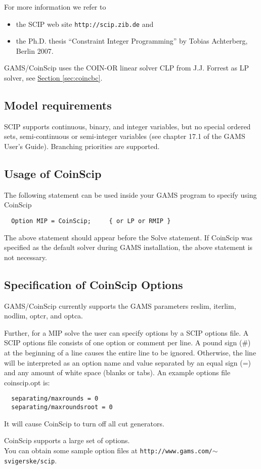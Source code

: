 For more information we refer to
\begin{itemize}
\item the SCIP web site \texttt{http://scip.zib.de} and
\item the Ph.D. thesis ``Constraint Integer Programming'' by Tobias Achterberg, Berlin 2007.
\end{itemize}

GAMS/CoinScip uses the COIN-OR linear solver CLP from J.J. Forrest as LP solver, see \hyperlink{sec:coincbc}{Section \ref{sec:coincbc}}.

\subsection{Model requirements}

SCIP supports continuous, binary, and integer variables, but no special ordered sets, semi-continuous or semi-integer variables (see chapter 17.1 of the GAMS User's Guide).
Branching priorities are supported.

\subsection{Usage of CoinScip}

The following statement can be used inside your GAMS program to specify using CoinScip
\begin{verbatim}
  Option MIP = CoinScip;     { or LP or RMIP }
\end{verbatim}

The above statement should appear before the Solve statement.
If CoinScip was specified as the default solver during GAMS installation, the above statement is not necessary.

\subsection{Specification of CoinScip Options}

GAMS/CoinScip currently supports the GAMS parameters reslim, iterlim, nodlim, optcr, and optca.

Further, for a MIP solve the user can specify options by a SCIP options file.
A SCIP options file consists of one option or comment per line.
A pound sign (\#) at the beginning of a line causes the entire line to be ignored.
Otherwise, the line will be interpreted as an option name and value separated by an equal sign (=) and any amount of white space (blanks or tabs).
An example options file coinscip.opt is:
\begin{verbatim}
  separating/maxrounds = 0
  separating/maxroundsroot = 0
\end{verbatim}
It will cause CoinScip to turn off all cut generators.

CoinScip supports a large set of options.\\
You can obtain some sample option files at \texttt{http://www.gams.com/$\sim$svigerske/scip}.

\chapterend
